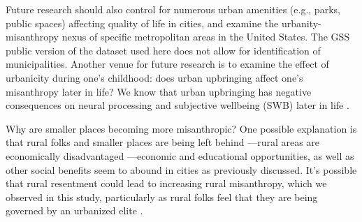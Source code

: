 \documentclass[11pt, letterpaper]{article}
\begin{document}
\begin{spacing}{1.4}
Future research should also control for numerous urban amenities (e.g., parks,
public spaces) affecting quality of life in cities, and examine the
urbanity-misanthropy nexus of specific metropolitan areas in the United
States. The GSS public version of the dataset used here does not allow for
identification of municipalities. Another venue for future research is to examine the effect of urbanicity during one's childhood: does urban upbringing affect one's misanthropy later in life? We know that urban upbringing has negative consequences on neural processing and subjective wellbeing (SWB) later in life \citep{lederbogen11,aok20}. 

Why are smaller places becoming more misanthropic? One possible explanation is that rural folks and smaller places are being left behind \citep{fullerNYT17monD,hansonCityJournalautumn15,aok-misanthropy-trustCity,aok-swbGenYcity18,aokCityBook15}---rural areas are economically disadvantaged \citep{glaeser11,osullivan09,florida21}---economic and educational opportunities, as well as other social benefits seem to abound in cities as previously discussed. It's possible that rural resentment could lead to increasing rural misanthropy, which we observed in this study, particularly as rural folks feel that they are being governed by an urbanized elite \citep{wuthnow18,fullerNYT17monD}. %
  


\end{spacing}
\end{document}
